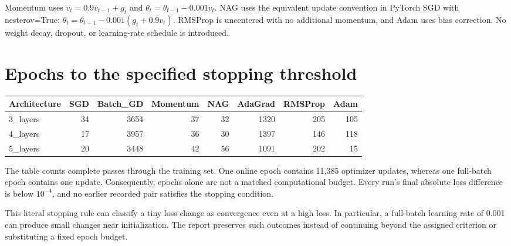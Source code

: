 \documentclass[11pt,a4paper]{article}
\begin{document}
Momentum uses $v_t=0.9v_{t-1}+g_t$ and $\theta_t=\theta_{t-1}-0.001v_t$. NAG uses the equivalent update convention in PyTorch SGD with nesterov=True: $\theta_t=\theta_{t-1}-0.001(g_t+0.9v_t)$. RMSProp is uncentered with no additional momentum, and Adam uses bias correction. No weight decay, dropout, or learning-rate schedule is introduced.


\clearpage

\section{Epochs to the specified stopping threshold}

\begingroup\scriptsize\setlength{\tabcolsep}{5pt}

\begin{tabularx}{\linewidth}{Yrrrrrrr}

\toprule

\textbf{Architecture} & \textbf{SGD} & \textbf{Batch\_GD} & \textbf{Momentum} & \textbf{NAG} & \textbf{AdaGrad} & \textbf{RMSProp} & \textbf{Adam} \\

\midrule

3\_layers & 34 & 3654 & 37 & 32 & 1320 & 205 & 105 \\

4\_layers & 17 & 3957 & 36 & 30 & 1397 & 146 & 118 \\

5\_layers & 20 & 3448 & 42 & 56 & 1091 & 202 & 15 \\

\bottomrule\end{tabularx}\endgroup\par\medskip

The table counts complete passes through the training set. One online epoch contains 11,385 optimizer updates, whereas one full-batch epoch contains one update. Consequently, epochs alone are not a matched computational budget. Every run's final absolute loss difference is below $10^{-4}$, and no earlier recorded pair satisfies the stopping condition.


This literal stopping rule can classify a tiny loss change as convergence even at a high loss. In particular, a full-batch learning rate of 0.001 can produce small changes near initialization. The report preserves such outcomes instead of continuing beyond the assigned criterion or substituting a fixed epoch budget.


\clearpage
\end{document}
